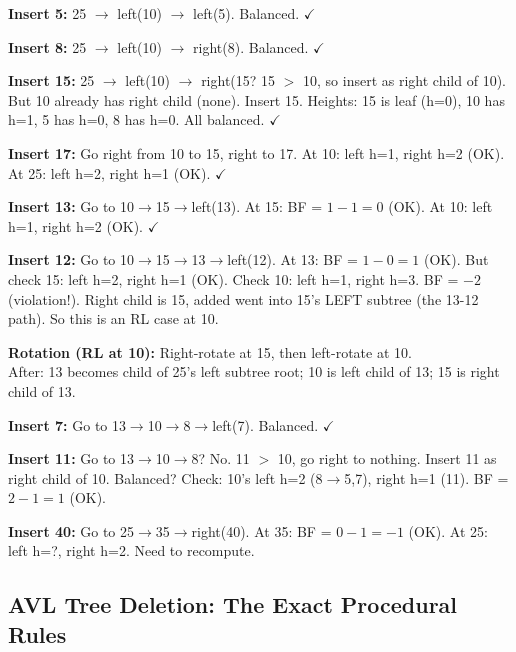 \documentclass[12pt,portrait]{article}
\begin{document}
\textbf{Insert 5:} 25 $\to$ left(10) $\to$ left(5). Balanced. $\checkmark$

\textbf{Insert 8:} 25 $\to$ left(10) $\to$ right(8). Balanced. $\checkmark$

\textbf{Insert 15:} 25 $\to$ left(10) $\to$ right(15? 15 $>$ 10, so insert as right child of 10). But 10 already has right child (none). Insert 15. Heights: 15 is leaf (h=0), 10 has h=1, 5 has h=0, 8 has h=0. All balanced. $\checkmark$

\textbf{Insert 17:} Go right from 10 to 15, right to 17. At 10: left h=1, right h=2 (OK). At 25: left h=2, right h=1 (OK). $\checkmark$

\textbf{Insert 13:} Go to 10$\to$15$\to$left(13). At 15: BF = $1-1=0$ (OK). At 10: left h=1, right h=2 (OK). $\checkmark$

\textbf{Insert 12:} Go to 10$\to$15$\to$13$\to$left(12). At 13: BF = $1-0=1$ (OK). But check 15: left h=2, right h=1 (OK). Check 10: left h=1, right h=3. BF = $-2$ (violation!). Right child is 15, added went into 15's LEFT subtree (the 13-12 path). So this is an RL case at 10.

\textbf{Rotation (RL at 10):} Right-rotate at 15, then left-rotate at 10.\\
After: 13 becomes child of 25's left subtree root; 10 is left child of 13; 15 is right child of 13.

\textbf{Insert 7:} Go to 13$\to$10$\to$8$\to$left(7). Balanced. $\checkmark$

\textbf{Insert 11:} Go to 13$\to$10$\to$8? No. 11 $>$ 10, go right to nothing. Insert 11 as right child of 10. Balanced? Check: 10's left h=2 (8$\to$5,7), right h=1 (11). BF = $2-1=1$ (OK).

\textbf{Insert 40:} Go to 25$\to$35$\to$right(40). At 35: BF = $0-1=-1$ (OK). At 25: left h=?, right h=2. Need to recompute.

\subsection{AVL Tree Deletion: The Exact Procedural Rules}
\label{sec:avl_delete}
\end{document}
